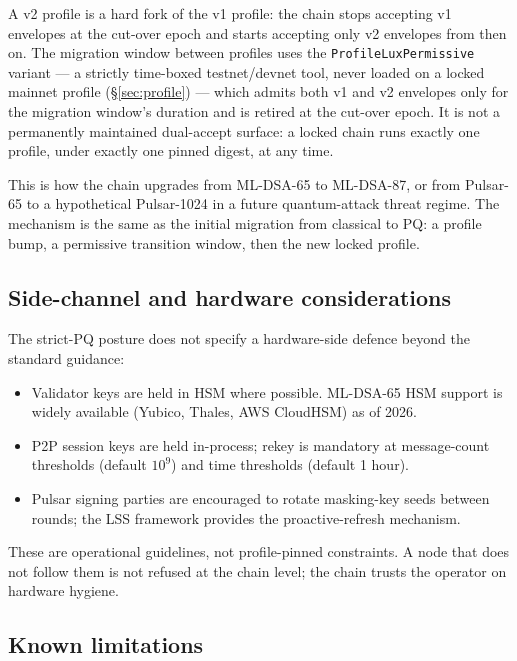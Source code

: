 A v2 profile is a hard fork of the v1 profile: the chain stops accepting
v1 envelopes at the cut-over epoch and starts accepting only v2 envelopes
from then on. The migration window between profiles uses the
\texttt{ProfileLuxPermissive} variant --- a strictly time-boxed
testnet/devnet tool, never loaded on a locked mainnet profile
(\S\ref{sec:profile}) --- which admits both v1 and v2 envelopes only for
the migration window's duration and is retired at the cut-over epoch. It
is not a permanently maintained dual-accept surface: a locked chain runs
exactly one profile, under exactly one pinned digest, at any time.

This is how the chain upgrades from ML-DSA-65 to ML-DSA-87, or from
Pulsar-65 to a hypothetical Pulsar-1024 in a future quantum-attack
threat regime. The mechanism is the same as the initial migration from
classical to PQ: a profile bump, a permissive transition window, then the
new locked profile.

\subsection{Side-channel and hardware considerations}

The strict-PQ posture does not specify a hardware-side defence beyond the
standard guidance:

\begin{itemize}[leftmargin=2em,nosep]
  \item Validator keys are held in HSM where possible. ML-DSA-65 HSM
    support is widely available (Yubico, Thales, AWS CloudHSM) as of 2026.
  \item P2P session keys are held in-process; rekey is mandatory at
    message-count thresholds (default $10^9$) and time thresholds (default
    1 hour).
  \item Pulsar signing parties are encouraged to rotate masking-key
    seeds between rounds; the LSS framework \cite{luxlssmpc} provides the
    proactive-refresh mechanism.
\end{itemize}

These are operational guidelines, not profile-pinned constraints. A node
that does not follow them is not refused at the chain level; the chain
trusts the operator on hardware hygiene.

\subsection{Known limitations}

